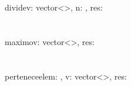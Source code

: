 \documentclass{article}
\begin{document}
    \section{}
        \begin{proc}{divide}{\In v: vector\textless\ent\textgreater, \In n: \ent, \Out res: \bool}{}
        \end{proc}

    \section{}
        \begin{proc}{maximo}{\In v: vector\textless\ent\textgreater, \Out res: \ent}{}
        \end{proc}

    \section{}
        \begin{proc}{pertenece}{\In elem: \ent, \In v: vector\textless\ent\textgreater, \Out res: \bool}{}
            \pre{\True}
        \end{proc}
\end{document}
